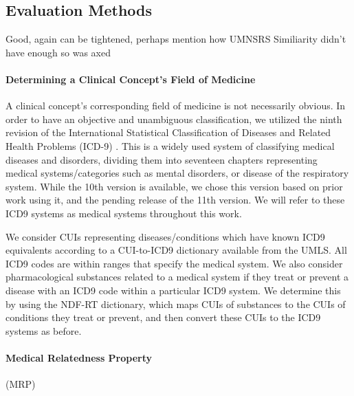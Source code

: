\documentclass[11pt,a4paper]{article}
\def\red#1{{\color{red}#1}}
\begin{document}


\subsection{Evaluation Methods}
\red{Good, again can be tightened, perhaps mention how UMNSRS Similiarity didn't have enough so was axed}


\paragraph{Determining a Clinical Concept's Field of Medicine}
A clinical concept's corresponding field of medicine is not necessarily obvious. In order to have an objective and unambiguous classification, we utilized the ninth revision of the International Statistical Classification of Diseases and Related Health Problems (ICD-9) \cite{sleeInternationalClassificationDiseases1978}. This is a widely used system of classifying medical diseases and disorders, dividing them into seventeen chapters representing medical systems/categories such as mental disorders, or disease of the respiratory system. While the 10th version is available, we chose this version based on prior work using it, and the pending release of the 11th version. We will refer to these ICD9 systems as medical systems throughout this work. 

We consider CUIs representing diseases/conditions which have known ICD9 equivalents according to a CUI-to-ICD9 dictionary available from the UMLS. All ICD9 codes are within ranges that specify the medical system. We also consider pharmacological substances related to a medical system if they treat or prevent a disease with an ICD9 code within a particular ICD9 system. We determine this by using the NDF-RT dictionary, which maps CUIs of substances to the CUIs of conditions they treat or prevent, and then convert these CUIs to the ICD9 systems as before.  

\paragraph{Medical Relatedness Property}(MRP)
\end{document}
